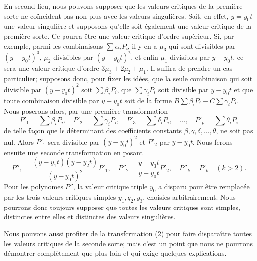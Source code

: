 \documentclass{article}
\begin{document}
En second lieu, nous pouvons supposer que les valeurs critiques de la première sorte ne coïncident pas non plus avec les valeurs singulières. Soit, en effet, $y = y_{0} t$ une valeur singulière et supposons qu'elle soit également une valeur critique de la première sorte. Ce pourra être une valeur critique d'ordre supérieur. Si, par exemple, parmi les combinaisons $\displaystyle\sum \alpha_{i} P_{i}$, il y en a $\mu_{3}$ qui sont divisibles par $(y - y_{0} t)^{3}$, $\mu_{2}$ divisibles par $(y - y_{0} t)^{2}$, et enfin $\mu_{1}$ divisibles par $y - y_{0} t$, ce sera une valeur critique d'ordre $3\mu_{3} + 2\mu_{2} + \mu_{1}$. Il suffira de prendre un cas particulier; supposons donc, pour fixer les idées, que la seule combinaison qui soit divisible par $(y - y_{0} t)^{2}$ soit $\displaystyle\sum \beta_{i} P_{i}$, que $\displaystyle\sum \gamma_{i} P_{i}$ soit divisible par $y - y_{0} t$ et que toute combinaison divisible par $y - y_{0} t$ soit de la forme $B\displaystyle\sum \beta_{i} P_{i} - C\displaystyle\sum \gamma_{i} P_{i}$. Nous poserons alors, par une première transformation
\[
P'_{1} = \sum \beta_{i} P_{i}, \quad P'_{2} = \sum \gamma_{i} P_{i}, \quad P'_{3} = \sum \delta_{i} P_{i}, \quad \ldots, \quad P'_{p} = \sum \theta_{i} P_{i}
\]
de telle façon que le déterminant des coefficients constants $\beta, \gamma, \delta, \ldots, \theta$, ne
soit pas nul. Alors $P'_{1}$ sera divisible par $(y - y_{0} t)^{2}$ et $P'_{2}$ par $y - y_{0} t$. Nous ferons ensuite une seconde transformation en posant
\[
P''_{1} = \frac{(y - y_{1} t)(y - y_{2} t)}{(y - y_{0} t)^{2}} P'_{1}, \quad P''_{2} = \frac{y - y_{3} t}{y - y_{0} t} P'_{2}, \quad P''_{k} = P'_{k} \quad (k > 2).
\]
Pour les polynomes $P''$, la valeur critique triple $y_{0}$ a disparu pour être remplacée par les trois valeurs critiques simples $y_{1}, y_{2}, y_{3}$, choisies arbitrairement. Nous pourrons donc toujours supposer que toutes les valeurs critiques sont simples, distinctes entre elles et distinctes des valeurs singulières.

Nous pouvons aussi profiter de la transformation (2) pour faire disparaître toutes les valeurs critiques de la seconde sorte; mais c'est un point que nous ne pourrons démontrer complètement que plus loin et qui exige quelques explications.
\end{document}
